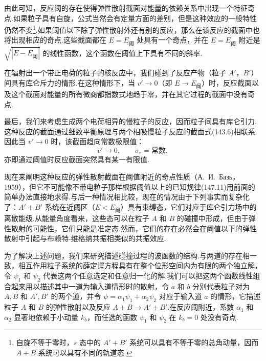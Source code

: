 由此可知，反应阈的存在使得弹性散射截面对能量的依赖关系中出现一个特征奇点.如果粒子具有自旋，公式当然会有定量方面的差别，但是这种效应的一般特性仍然不变\footnote{自旋不等于零时，$s$ 态中的 $A'+B'$ 系统可以具有不等于零的总角动量，因而 $A+B$ 系统可以具有不同的轨道态.}.如果阈值以下除了弹性散射外还有别的反应，那么在该反应的截面中也将出现相应的奇点.这些截面都在 $E=E_{\text{阈}}$ 处具有一个奇点，并在 $E=E_{\text{阈}}$ 附近是 $\sqrt{|E-E_{\text{阈}}|}$ 的线性函数，这个函数在阈值上下具有不同的斜率.

在辐射出一个带正电荷的粒子的核反应中，我们碰到了反应产物（粒子 $A'$，$B'$）间具有库仑斥力的情形.在这种情形下，当 $v'\to0$（即 $E\to E_{\text{阈}}$）时，反应截面以及这个截面对能量的所有微商都指数式地趋于零，并在其它过程的截面中没有奇点.

最后，我们来考虑生成两个电荷相异的慢粒子的反应，因而粒子间具有库仑引力.这种反应的截面通过细致平衡原理与两个相吸慢粒子反应的截面式(143.6)相联系.因此当 $v'\to0$ 时，该截面趋向常数极限值：
\begin{equation}
  v'\to0,\qquad \sigma_r=\text{常数},
\end{equation}
亦即通过阈值时反应截面突然具有某一有限值.

现在来阐明这种反应的弹性散射截面在阈值附近的奇点性质（А.~И.~Базь，1959），但它不可能像不带电粒子那样根据阈值以上的已知规律(147.11)用前面的简单办法直接地求得.与后一种情况相比较，现在的情况由于下列事实而复杂化了：$A'+B'$ 系统在近阈区（$E<E_{\text{阈}}$）具有束缚态，它们对应于库仑引力场中的离散能级.从能量角度看来，这些态可以在粒子 $A$ 和 $B$ 的碰撞中形成，但由于弹性散射的可能性，它们只能是准定态.然而，它们的存在必然会在阈值以下的弹性散射中引起与布赖特-维格纳共振相类似的共振效应.

为了解决上述问题，我们来研究描述碰撞过程的波函数的结构.与两道的存在相一致，相互作用粒子系统的薛定谔方程具有在整个位形空间内为有限的两个独立解，令 $\psi_1$ 和 $\psi_2$ 代表这两个任意选定和任意归一化的解.我们可以把这两个函数线性组合起来用以描述其中一道为输入道情形时的散射，令 $a$ 和 $b$ 分别代表粒子对为 $A,B$ 和 $A',B'$ 的两个道，并令 $\psi=\alpha_1\psi_1+\alpha_2\psi_2$ 对应于输入道 $a$ 的情形，它描述粒子 $A$ 和 $B$ 的弹性散射以及反应 $A+B\to A'+B'$.在反应阈附近，系数 $\alpha_1$ 和 $\alpha_2$ 显著地依赖于小动量 $k_b$，而任选的函数 $\psi_1$ 和 $\psi_2$ 在 $k_b=0$ 处没有奇点.

